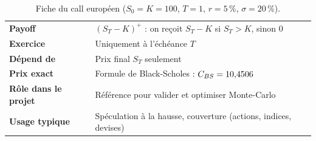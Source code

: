 \begin{table}[H]
\centering\small
\begin{tabularx}{\textwidth}{>{\bfseries}p{3.2cm}L}
\toprule
Payoff & $(S_T-K)^+$ : on reçoit $S_T-K$ si $S_T>K$, sinon $0$ \\
Exercice & Uniquement à l'échéance $T$ \\
Dépend de & Prix final $S_T$ seulement \\
Prix exact & Formule de Black-Scholes : $C_{BS} = 10{,}4506$ \\
Rôle dans le projet & Référence pour valider et optimiser Monte-Carlo \\
Usage typique & Spéculation à la hausse, couverture (actions, indices, devises) \\
\bottomrule
\end{tabularx}
\caption{Fiche du call européen ($S_0=K=100$, $T=1$, $r=5\,\%$, $\sigma=20\,\%$).}
\end{table}
